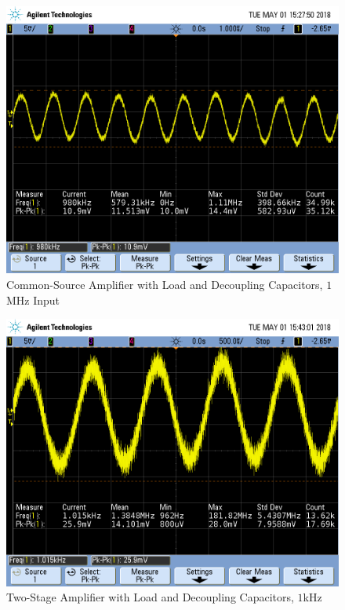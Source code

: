 \FloatBarrier

\FloatBarrier

\begin{figure}[h!]
	\centering
	\includegraphics[scale=0.45]{./images/SCOPE_15.PNG}
	\caption{Common-Source Amplifier with Load and Decoupling Capacitors, $1$\si{\mega\hertz} Input}
	\label{fig:SCOPE_15}
\end{figure}

\FloatBarrier

\FloatBarrier

\begin{figure}[h!]
	\centering
	\includegraphics[scale=0.45]{./images/SCOPE_18.PNG}
	\caption{Two-Stage Amplifier with Load and Decoupling Capacitors, $1$\si{\kilo\hertz}}
	\label{fig:SCOPE_18}
\end{figure}

